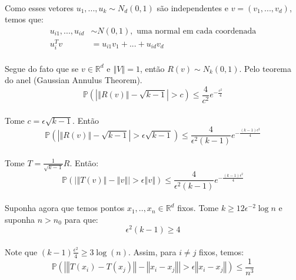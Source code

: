 \paragraph{}Como esses vetores $u_1,...,u_k \sim N_d(0,1)$ são independentes e $v = (v_1,...,v_d)$, temos que:
\begin{align*}
    u_{i1},...,u_{id} &\sim N(0,1), \text{ uma normal em cada coordenada}\\
    u^T_iv &= u_{i1}v_1 +...+u_{id}v_d
\end{align*}
\paragraph{}Segue do fato que se $v \in \mathbb{R}^d$ e $\left\Vert V \right\Vert = 1$, então $R(v) \sim N_k(0,1)$. Pelo teorema do anel (Gaussian Annulus Theorem).
\begin{equation*}
    \mathbb{P}\left(\left\vert \left\Vert R(v) \right\Vert - \sqrt{k-1} \right\vert > c\right) \leq \frac{4}{c^2}e^{-\frac{c^2}{4}}
\end{equation*}
\paragraph{} Tome $c = \epsilon\sqrt{k-1}$. Então
\begin{equation*}
    \mathbb{P}(\left\vert \left\Vert R(v) \right\Vert - \sqrt{k-1} \right\vert > \epsilon\sqrt{k-1}) \leq \frac{4}{\epsilon^2(k-1)}e^{-\frac{(k-1)\epsilon^2}{4}}
\end{equation*}
\paragraph{}Tome $T=\frac{1}{\sqrt{k-1}}R$. Então:
\begin{equation*}
    \mathbb{P}(\left\vert \left\Vert T(v) \right\Vert - \left\Vert v \right\Vert \right\vert > \epsilon\left\Vert v \right\Vert) \leq \frac{4}{\epsilon^2(k-1)}e^{-\frac{(k-1)\epsilon^2}{4}}
\end{equation*}
\paragraph{}Suponha agora que temos pontos $x_1,..,x_n \in \mathbb{R}^d$ fixos. Tome $k \geq 12\epsilon^{-2}\log{n}$ e suponha $n>n_0$ para que:
\begin{equation*}
    \epsilon^2(k-1) \geq 4
\end{equation*}
\paragraph{}Note que $(k-1)\frac{\epsilon^2}{4} \geq 3\log(n)$. Assim, para $i \neq j$ fixos, temos:
\begin{equation*}
    \mathbb{P}(\left\vert \left\Vert T(x_i) - T(x_j) \right\Vert - \left\Vert x_i - x_j \right\Vert \right\vert > \epsilon\left\Vert x_i - x_j \right\Vert) \leq \frac{1}{n^3}
\end{equation*}
